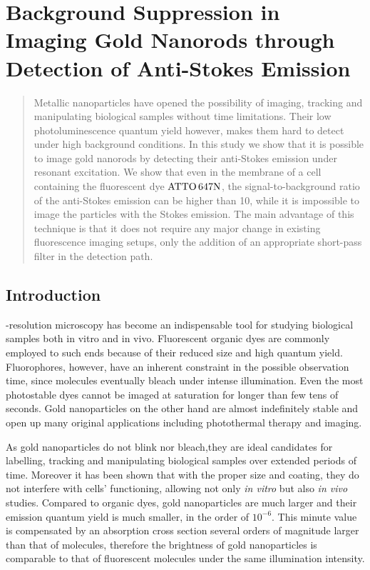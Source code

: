 \chapter[Background-Free Imaging]{Background Suppression in Imaging Gold
Nanorods through Detection of Anti-Stokes Emission}
\label{ch:Imaging}


\begin{abstract}
Metallic nanoparticles have opened the possibility of
imaging, tracking and manipulating biological samples without time limitations.
Their low photoluminescence quantum yield however, makes them hard to detect
under high background conditions. In this study we show that it is possible to
image gold nanorods by detecting their anti-Stokes emission under resonant
excitation. We show that even in the membrane of a cell containing the
fluorescent dye $\textrm{ATTO}\,647\textrm{N}$, the signal-to-background ratio of the anti-Stokes
emission can be higher than 10, while it is impossible to image the
particles with the Stokes emission. The main advantage of this technique is that
it does not require any major change in existing fluorescence imaging setups,
only the addition of an appropriate short-pass filter in the detection path.
\end{abstract}

\newpage

\section{Introduction}
-resolution microscopy has become an indispensable tool for
studying biological samples both in vitro and in vivo\cite{Moerner2007}.
Fluorescent organic dyes are commonly employed to such ends because of their
reduced size and high quantum yield\cite{Lichtman2005}. Fluorophores, however,
have an inherent constraint  in the possible observation time, since molecules
eventually bleach under intense illumination\cite{Shaner2005}. Even the most photostable
dyes cannot be imaged at saturation for longer than few tens of seconds. Gold
nanoparticles on the other hand are almost indefinitely stable\cite{Jana2001}
and open up many original applications including photothermal
therapy\cite{Alkilany2012} and imaging\cite{VandenBroek2013}.

As gold nanoparticles do not blink nor
bleach\cite{PEREZJUSTE2005,Mohamed2000},they are ideal candidates for
labelling\cite{Yao2014}, tracking\cite{Spillane2014} and
manipulating\cite{Urban2011} biological samples over extended periods of time.
Moreover it has been shown that with the proper size and coating, they do not
interfere with cells' functioning\cite{Lewinski2008}, allowing not only
\textit{in vitro} but also \textit{in vivo} studies. Compared to organic dyes,
gold nanoparticles are much larger and their emission quantum yield is much
smaller, in the order of $10^{-6}$\cite{Yorulmaz2012}. This minute value is
compensated by an absorption cross section several orders of magnitude larger
than that of molecules\cite{Link1999}, therefore the brightness of gold
nanoparticles is comparable to that of fluorescent molecules under the same
illumination intensity.

